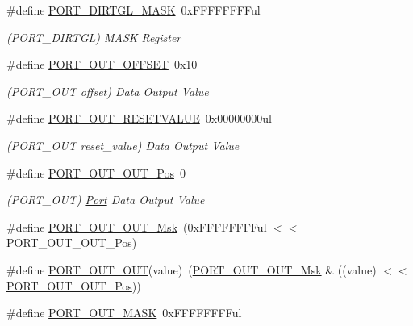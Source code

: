 \begin{DoxyCompactItemize}
\item 
\#define \mbox{\hyperlink{group___s_a_m_d21___p_o_r_t_gaad67e44b66d1e6d214a468d19fe5c37b}{P\+O\+R\+T\+\_\+\+D\+I\+R\+T\+G\+L\+\_\+\+M\+A\+SK}}~0x\+F\+F\+F\+F\+F\+F\+F\+Ful
\begin{DoxyCompactList}\small\item\em (P\+O\+R\+T\+\_\+\+D\+I\+R\+T\+GL) M\+A\+SK Register \end{DoxyCompactList}\item 
\#define \mbox{\hyperlink{group___s_a_m_d21___p_o_r_t_ga613c002dd1466d78b367184b2e8d5702}{P\+O\+R\+T\+\_\+\+O\+U\+T\+\_\+\+O\+F\+F\+S\+ET}}~0x10
\begin{DoxyCompactList}\small\item\em (P\+O\+R\+T\+\_\+\+O\+UT offset) Data Output Value \end{DoxyCompactList}\item 
\#define \mbox{\hyperlink{group___s_a_m_d21___p_o_r_t_gaf021492775d0fe23716f66e5ee65ef34}{P\+O\+R\+T\+\_\+\+O\+U\+T\+\_\+\+R\+E\+S\+E\+T\+V\+A\+L\+UE}}~0x00000000ul
\begin{DoxyCompactList}\small\item\em (P\+O\+R\+T\+\_\+\+O\+UT reset\+\_\+value) Data Output Value \end{DoxyCompactList}\item 
\#define \mbox{\hyperlink{group___s_a_m_d21___p_o_r_t_ga2311d33aa22995c6371e1a7f8fbf4b8b}{P\+O\+R\+T\+\_\+\+O\+U\+T\+\_\+\+O\+U\+T\+\_\+\+Pos}}~0
\begin{DoxyCompactList}\small\item\em (P\+O\+R\+T\+\_\+\+O\+UT) \mbox{\hyperlink{struct_port}{Port}} Data Output Value \end{DoxyCompactList}\item 
\#define \mbox{\hyperlink{group___s_a_m_d21___p_o_r_t_ga9c23adb5d24fc6e1b2f4eeaa5b14bfa6}{P\+O\+R\+T\+\_\+\+O\+U\+T\+\_\+\+O\+U\+T\+\_\+\+Msk}}~(0x\+F\+F\+F\+F\+F\+F\+F\+Ful $<$$<$ P\+O\+R\+T\+\_\+\+O\+U\+T\+\_\+\+O\+U\+T\+\_\+\+Pos)
\item 
\#define \mbox{\hyperlink{group___s_a_m_d21___p_o_r_t_ga089cc4f40a2dbf3abb393017317fdf5d}{P\+O\+R\+T\+\_\+\+O\+U\+T\+\_\+\+O\+UT}}(value)~(\mbox{\hyperlink{group___s_a_m_d21___p_o_r_t_ga9c23adb5d24fc6e1b2f4eeaa5b14bfa6}{P\+O\+R\+T\+\_\+\+O\+U\+T\+\_\+\+O\+U\+T\+\_\+\+Msk}} \& ((value) $<$$<$ \mbox{\hyperlink{group___s_a_m_d21___p_o_r_t_ga2311d33aa22995c6371e1a7f8fbf4b8b}{P\+O\+R\+T\+\_\+\+O\+U\+T\+\_\+\+O\+U\+T\+\_\+\+Pos}}))
\item 
\#define \mbox{\hyperlink{group___s_a_m_d21___p_o_r_t_ga14d208ae2f33fb3a123593bc0ee91b5c}{P\+O\+R\+T\+\_\+\+O\+U\+T\+\_\+\+M\+A\+SK}}~0x\+F\+F\+F\+F\+F\+F\+F\+Ful

\end{DoxyCompactItemize}
